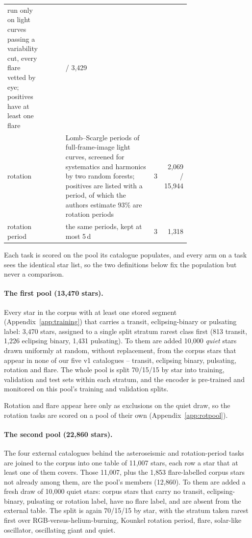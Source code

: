 \documentclass{article}
\begin{document}
\begin{table}[H]
\begin{tabular}{>{\raggedright\arraybackslash}p{0.12\linewidth}>{\raggedright\arraybackslash}p{0.12\linewidth}>{\raggedright\arraybackslash}p{0.5\linewidth}cr}
run only on light curves passing a variability cut, every flare vetted by eye; positives have at least
one flare & 2 & 304 / 3{,}429 \\
rotation & \citet{boyle2026} & Lomb--Scargle periods of full-frame-image light curves, screened for
systematics and harmonics by two random forests; positives are listed with a period, of which the
authors estimate 93\% are rotation periods & 3 & 2{,}069 / 15{,}944 \\
rotation period & \citet{boyle2026} & the same periods, kept at most 5\,d & 3 & 1{,}318 \\
\bottomrule
\end{tabular}
\end{table}

Each task is scored on the pool its catalogue populates, and every arm on a task sees the identical
star list, so the two definitions below fix the population but never a comparison.

\paragraph{The first pool (13{,}470 stars).} Every star in the corpus with at least one stored segment (Appendix~\ref{app:training})
that carries a transit, eclipsing-binary or pulsating label: 3{,}470 stars, assigned to a single
split stratum rarest class first (813 transit, 1{,}226 eclipsing binary, 1{,}431 pulsating). To them
are added 10{,}000 \emph{quiet} stars drawn uniformly at random, without replacement, from the corpus
stars that appear in none of our five v1 catalogues -- transit, eclipsing binary, pulsating, rotation
and flare. The whole pool is split 70/15/15 by star into training, validation and test
sets within each stratum, and the encoder is
pre-trained and monitored on this pool's training and validation splits.

Rotation and flare appear here only as exclusions on the quiet draw, so the rotation tasks are scored
on a pool of their own (Appendix~\ref{app:rotpool}).

\paragraph{The second pool (22{,}860 stars).} The four external catalogues behind the asteroseismic
and rotation-period tasks are joined to the corpus into one table of 11{,}007 stars, each row a star
that at least one of them covers. Those 11{,}007, plus the 1{,}853 flare-labelled corpus stars not
already among them, are the pool's members (12{,}860). To them are added a fresh draw of 10{,}000
quiet stars: corpus stars that carry no transit, eclipsing-binary, pulsating or rotation label, have
no flare label, and are absent from the external table. The split is again 70/15/15 by star, with the
stratum taken rarest first over RGB-versus-helium-burning, Kounkel rotation period, flare, solar-like
oscillator, oscillating giant and quiet.
\end{document}
